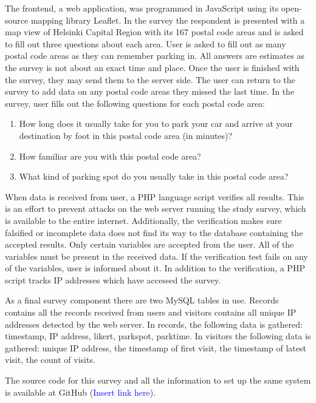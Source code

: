 The frontend, a web application, was programmed in JavaScript using its open-source mapping library Leaflet. In the survey the respondent is presented with a map view of Helsinki Capital Region with its 167 postal code areas and is asked to fill out three questions about each area. User is asked to fill out as many postal code areas as they can remember parking in. All answers are estimates as the survey is not about an exact time and place. Once the user is finished with the survey, they may send them to the server side. The user can return to the survey to add data on any postal code areas they missed the last time. In the survey, user fills out the following questions for each postal code area:

\begin{spacing}{1}
\begin{enumerate}
  \item How long does it usually take for you to park your car and arrive at your destination by foot in this postal code area (in minutes)?
  \item How familiar are you with this postal code area?
  \item What kind of parking spot do you usually take in this postal code area?
\end{enumerate}
\end{spacing}

\noindent
When data is received from user, a PHP language script verifies all results. This is an effort to prevent attacks on the web server running the study survey, which is available to the entire internet. Additionally, the verification makes sure falsified or incomplete data does not find its way to the database containing the accepted results. Only certain variables are accepted from the user. All of the variables must be present in the received data. If the verification test fails on any of the variables, user is informed about it. In addition to the verification, a PHP script tracks IP addresses which have accessed the survey.

As a final survey component there are two MySQL tables in use. Records contains all the records received from users and visitors contains all unique IP addresses detected by the web server. In records, the following data is gathered: timestamp, IP address, likert, parkspot, parktime. In visitors the following data is gathered: unique IP address, the timestamp of first visit, the timestamp of latest visit, the count of visits.

The source code for this survey and all the information to set up the same system is available at GitHub (\textcolor{blue}{Insert link here}).

